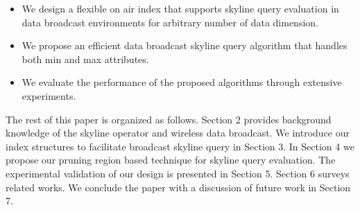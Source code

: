 
\begin{itemize}
\item We design a flexible on air index that supports skyline
query evaluation in data broadcast environments for arbitrary
number of data dimension.

\item We propose an efficient data broadcast skyline query
algorithm that handles both min and max attributes.

\item We evaluate the performance of the proposed algorithms
through extensive experiments.
\end{itemize}

The rest of this paper is organized as follows. Section 2 provides
background knowledge of the skyline operator and wireless data
broadcast. We introduce our index structures to facilitate
broadcast skyline query in Section 3. In Section 4 we propose our
pruning region based technique for skyline query evaluation. The
experimental validation of our design is presented in Section 5.
Section 6 surveys related works. We conclude the paper with a
discussion of future work in Section 7.
